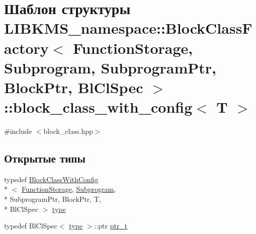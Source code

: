 \hypertarget{structLIBKMS__namespace_1_1BlockClassFactory_1_1block__class__with__config}{\section{Шаблон структуры L\-I\-B\-K\-M\-S\-\_\-namespace\-:\-:Block\-Class\-Factory$<$ Function\-Storage, Subprogram, Subprogram\-Ptr, Block\-Ptr, Bl\-Cl\-Spec $>$\-:\-:block\-\_\-class\-\_\-with\-\_\-config$<$ T $>$}
\label{structLIBKMS__namespace_1_1BlockClassFactory_1_1block__class__with__config}
}


{\ttfamily \#include $<$block\-\_\-class.\-hpp$>$}

\subsection*{Открытые типы}
\begin{DoxyCompactItemize}
\item 
typedef \hyperlink{structLIBKMS__namespace_1_1BlockClassWithConfig}{Block\-Class\-With\-Config}\\*
$<$ \hyperlink{classLIBKMS__namespace_1_1FunctionStorage}{Function\-Storage}, \hyperlink{classLIBKMS__namespace_1_1Subprogram}{Subprogram}, \\*
Subprogram\-Ptr, Block\-Ptr, T, \\*
Bl\-Cl\-Spec $>$ \hyperlink{structLIBKMS__namespace_1_1BlockClassFactory_1_1block__class__with__config_a956d434fd3184b2a9a7c37e3a2421a81}{type}
\item 
typedef Bl\-Cl\-Spec$<$ \hyperlink{structLIBKMS__namespace_1_1BlockClassFactory_1_1block__class__with__config_a956d434fd3184b2a9a7c37e3a2421a81}{type} $>$\-::ptr \hyperlink{structLIBKMS__namespace_1_1BlockClassFactory_1_1block__class__with__config_aefd1235b6ca3cf84ea61f772ae4d50e1}{ptr\-\_\-t}
\end{DoxyCompactItemize}


